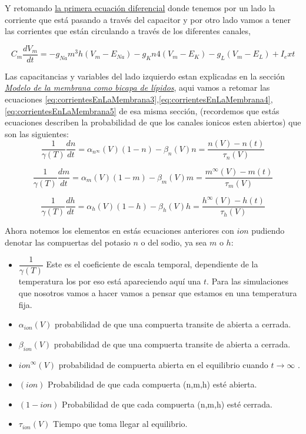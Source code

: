 Y retomando \hyperlink{LaEq}{la primera ecuación diferencial} donde tenemos por un lado la corriente que está pasando a través del capacitor y por otro lado vamos a tener las corrientes que están circulando a través de los diferentes canales, 

\begin{equation}
  C_{m} \dfrac{dV_{m}}{dt} =  - g_{Na} m^3 h(V_{m} - E_{Na} ) - g_{K} n 4 (V_{m} - E_{K} ) - g_{L} (V_{m} - E_{L} ) + I_ext
  \label{eq:corrientesRepaso}
\end{equation}

Las capacitancias y variables del lado izquierdo estan explicadas en la sección \hyperlink{secc}{\emph{Modelo de la membrana como bicapa de lípidos}}, aqui vamos a retomar las ecuaciones \ref{eq:corrientesEnLaMembrana3},\ref{eq:corrientesEnLaMembrana4},\ref{eq:corrientesEnLaMembrana5} de esa misma sección, (recordemos que estás ecuaciones describen la probabilidad de que los canales ionicos esten abiertos) que son las siguientes:
\begin{equation}
  \dfrac{1}{\gamma(T)}\dfrac{dn}{dt} =  \alpha_{n^\infty} (V)(1 - n) - \beta_{n} (V) n = \dfrac{n(V)-n(t)}{\tau_{n}(V)}
  \label{eq:probabilidades1}
\end{equation}

\begin{equation}
  \dfrac{1}{\gamma(T)}\dfrac{dm}{dt} =  \alpha_{m} (V)(1 - m) - \beta_{m} (V) m = \dfrac{m^\infty(V)-m(t)}{\tau_{m}(V)}
  \label{eq:probabilidades2}
\end{equation}

\begin{equation}
  \dfrac{1}{\gamma(T)}\dfrac{dh}{dt} =  \alpha_{h} (V)(1 - h) - \beta_{h} (V) h = \dfrac{h^\infty(V)-h(t)}{\tau_{h}(V)}
  \label{eq:probabilidades3}
\end{equation}

Ahora notemos los elementos en estás ecuaciones anteriores con \(ion\) pudiendo denotar las compuertas del potasio \(n\) o del sodio, ya sea \(m\) o \(h\):
\begin{itemize}
 \item \(\dfrac{1}{\gamma(T)}\) Este es el coeficiente de escala temporal, dependiente de la temperatura los por eso está apareciendo aquí una \(t\). Para las simulaciones que nosotros vamos a hacer vamos a pensar que estamos en una temperatura fija. 
 \item \(\alpha_{ion}(V)\) probabilidad de que una compuerta transite de abierta a cerrada.
 \item \(\beta_{ion}(V)\) probabilidad de que una compuerta transite de abierta a cerrada.
 \item \(ion^\infty(V)\) probabilidad de compuerta abierta en el equilibrio cuando \(t \rightarrow \infty\) .
 \item \((ion)\) Probabilidad de que cada compuerta (n,m,h) esté abierta.
 \item \((1-ion)\) Probabilidad de que cada compuerta (n,m,h) esté cerrada.
 
 \item \(\tau_{ion}(V)\) Tiempo que toma llegar al equilibrio.
\end{itemize}


